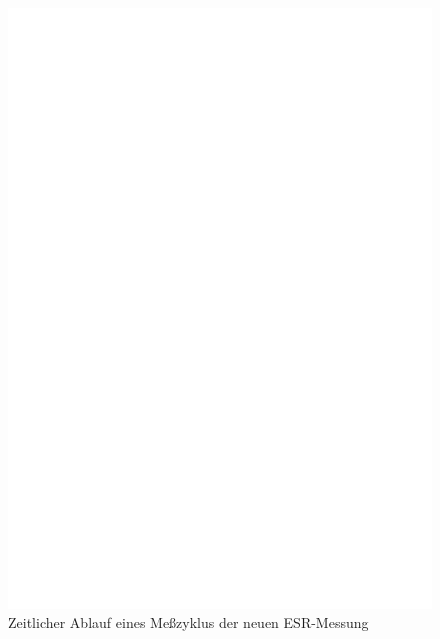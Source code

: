\begin{figure}[H]
  \centering
    \includegraphics[width=18cm]{../FIG/Cap_esr2_timing.eps}
  \caption{Zeitlicher Ablauf eines Meßzyklus der neuen ESR-Messung}
  \label{fig:Cap_esr2_timing}
\end{figure}

